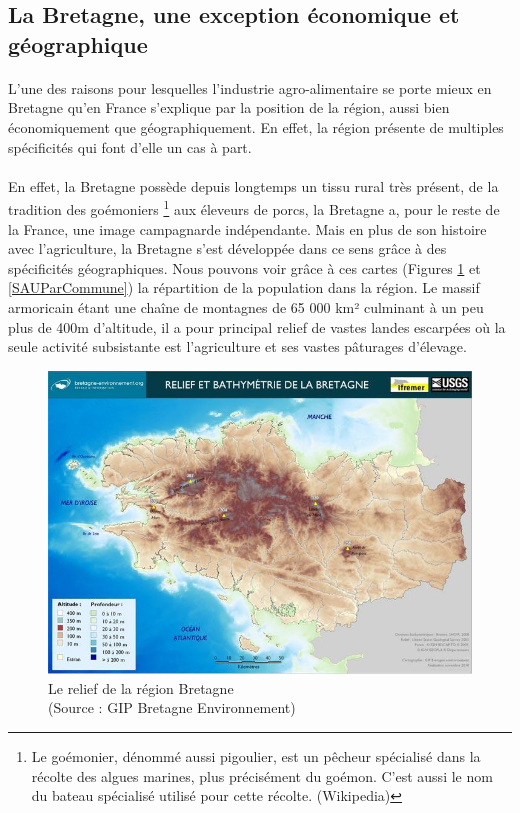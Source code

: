 \documentclass[a4paper,12pt]{report}
\begin{document}
		\subsection{La Bretagne, une exception économique et géographique}
			\paragraph{}L’une des raisons pour lesquelles l’industrie agro-alimentaire se porte mieux en Bretagne qu’en France s’explique par la position de la région, aussi bien économiquement que géographiquement. En effet, la région présente de multiples spécificités qui font d’elle un cas à part.
			
			\paragraph{}En effet, la Bretagne possède depuis longtemps un tissu rural très présent, de la tradition des goémoniers \footnote{Le goémonier, dénommé aussi pigoulier, est un pêcheur spécialisé dans la récolte des algues marines, plus précisément du goémon. C'est aussi le nom du bateau spécialisé utilisé pour cette récolte. (Wikipedia)} aux éleveurs de porcs, la Bretagne a, pour le reste de la France, une image campagnarde indépendante. Mais en plus de son histoire avec l’agriculture, la Bretagne s’est développée dans ce sens grâce à des spécificités géographiques. Nous pouvons voir grâce à ces cartes (Figures \ref{ReliefBathymetrie} et \ref{SAUParCommune}) la répartition de la population dans la région. Le massif armoricain étant une chaîne de montagnes de 65 000 km² culminant à un peu plus de 400m d’altitude, il a pour principal relief de vastes landes escarpées où la seule activité subsistante est l’agriculture et ses vastes pâturages d’élevage.
			
			\begin{figure}[!h]
			\centering
			\includegraphics[width=17cm]{Illustrations/ReliefEtBathymetrie.jpg}
			\caption{Le relief de la région Bretagne\\(Source : GIP Bretagne Environnement\cite{BretagneEnvironnement})}
			\label{ReliefBathymetrie}
			\end{figure}
			
\end{document}
